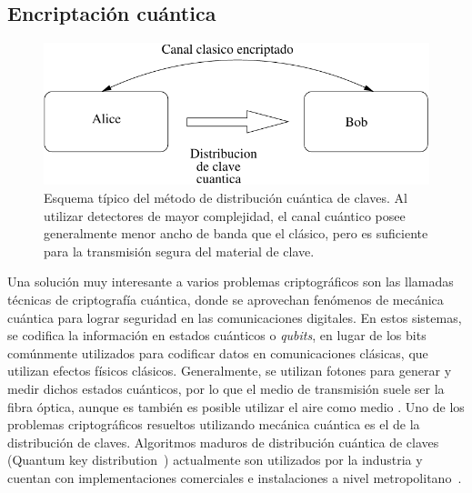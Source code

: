 
\subsection{Encriptación cuántica}

\begin{figure}[t]
  \centering
  \includegraphics[width=0.7 \textwidth]{graphs/quantum} 
  \caption{Esquema típico del método de distribución cuántica de claves. Al utilizar detectores de mayor complejidad, el canal cuántico posee generalmente menor ancho de banda que el clásico, pero es suficiente para la transmisión segura del material de clave.}
  \label{fig_quant}
\end{figure}


\label{quantcry}
Una solución muy interesante a varios problemas criptográficos son las llamadas técnicas de criptografía cuántica, donde se aprovechan fenómenos de mecánica cuántica para lograr seguridad en las comunicaciones digitales.
En estos sistemas, se codifica la información en estados cuánticos o \textit{qubits}, en lugar de los bits comúnmente utilizados para codificar datos en comunicaciones clásicas, que utilizan efectos físicos clásicos. Generalmente, se utilizan fotones para generar y medir dichos estados cuánticos, por lo que el medio de transmisión suele ser la fibra óptica, aunque es también es posible utilizar el aire como medio \cite{alleaume2004experimental}.
Uno de los problemas criptográficos resueltos utilizando mecánica cuántica es el de la distribución de claves. Algoritmos maduros de distribución cuántica de claves (Quantum key distribution~\cite{bb84}) actualmente son utilizados por la industria y cuentan con implementaciones comerciales e instalaciones a nivel metropolitano~\cite{sasaki2011field}. 

